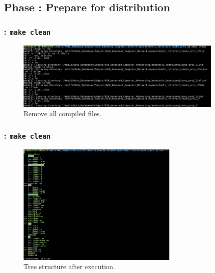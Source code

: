 \subsection{Phase : Prepare for distribution}

\begin{frame}
    \frametitle{: \texttt{make clean}}

    \begin{figure}[H]
        \centering
        \includegraphics[width=0.9\textwidth]{../figure/autotool_10.png}
        \caption*{Remove all compiled files.}
    \end{figure}
\end{frame}

\begin{frame}
    \frametitle{: \texttt{make clean}}

    \begin{figure}[H]
        \centering
        \includegraphics[width=0.7\textwidth]{../figure/autotool_11.png}
        \caption*{Tree structure after execution.}
    \end{figure}
\end{frame}

